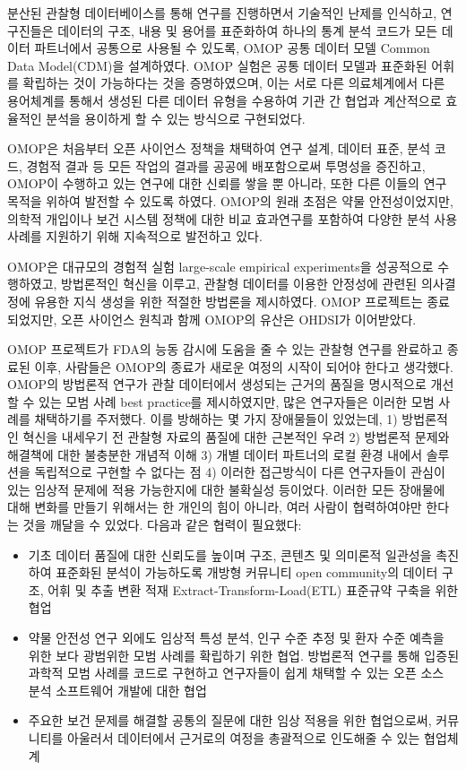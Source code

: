 \documentclass[10.5pt]{book}
\providecommand{\tightlist}{%
  \setlength{\itemsep}{0pt}\setlength{\parskip}{0pt}}
\theoremstyle{definition}
\theoremstyle{definition}
\theoremstyle{definition}
\theoremstyle{remark}
\begin{document}
분산된 관찰형 데이터베이스를 통해 연구를 진행하면서 기술적인 난제를
인식하고, 연구진들은 데이터의 구조, 내용 및 용어를 표준화하여 하나의
통계 분석 코드가 모든 데이터 파트너에서 공통으로 사용될 수 있도록, OMOP
공통 데이터 모델 Common Data Model(CDM)을 설계하였다.
\citep{overhage2012cdm} OMOP 실험은 공통 데이터 모델과 표준화된 어휘를
확립하는 것이 가능하다는 것을 증명하였으며, 이는 서로 다른 의료체계에서
다른 용어체계를 통해서 생성된 다른 데이터 유형을 수용하여 기관 간 협업과
계산적으로 효율적인 분석을 용이하게 할 수 있는 방식으로 구현되었다.

OMOP은 처음부터 오픈 사이언스 정책을 채택하여 연구 설계, 데이터 표준,
분석 코드, 경험적 결과 등 모든 작업의 결과를 공공에 배포함으로써
투명성을 증진하고, OMOP이 수행하고 있는 연구에 대한 신뢰를 쌓을 뿐
아니라, 또한 다른 이들의 연구 목적을 위하여 발전할 수 있도록 하였다.
OMOP의 원래 초점은 약물 안전성이었지만, 의학적 개입이나 보건 시스템
정책에 대한 비교 효과연구를 포함하여 다양한 분석 사용사례를 지원하기
위해 지속적으로 발전하고 있다.

OMOP은 대규모의 경험적 실험 large-scale empirical experiments을
성공적으로 수행하였고, \citep{ryan2012omop, ryan2013omop} 방법론적인
혁신을 이루고, \citep{schuemie_2014} 관찰형 데이터를 이용한 안정성에
관련된 의사결정에 유용한 지식 생성을 위한 적절한 방법론을 제시하였다.
\citep{madigan_2013, madigan2013design} OMOP 프로젝트는 종료되었지만,
오픈 사이언스 원칙과 함께 OMOP의 유산은 OHDSI가 이어받았다.

OMOP 프로젝트가 FDA의 능동 감시에 도움을 줄 수 있는 관찰형 연구를
완료하고 종료된 이후, 사람들은 OMOP의 종료가 새로운 여정의 시작이 되어야
한다고 생각했다. OMOP의 방법론적 연구가 관찰 데이터에서 생성되는 근거의
품질을 명시적으로 개선할 수 있는 모범 사례 best practice를 제시하였지만,
많은 연구자들은 이러한 모범 사례를 채택하기를 주저했다. 이를 방해하는 몇
가지 장애물들이 있었는데, 1) 방법론적인 혁신을 내세우기 전 관찰형 자료의
품질에 대한 근본적인 우려 2) 방법론적 문제와 해결책에 대한 불충분한
개념적 이해 3) 개별 데이터 파트너의 로컬 환경 내에서 솔루션을 독립적으로
구현할 수 없다는 점 4) 이러한 접근방식이 다른 연구자들이 관심이 있는
임상적 문제에 적용 가능한지에 대한 불확실성 등이었다. 이러한 모든
장애물에 대해 변화를 만들기 위해서는 한 개인의 힘이 아니라, 여러 사람이
협력하여야만 한다는 것을 깨달을 수 있었다. 다음과 같은 협력이 필요했다:

\begin{itemize}
\tightlist
\item
  기초 데이터 품질에 대한 신뢰도를 높이며 구조, 콘텐츠 및 의미론적
  일관성을 촉진하여 표준화된 분석이 가능하도록 개방형 커뮤니티 open
  community의 데이터 구조, 어휘 및 추출 변환 적재
  Extract-Transform-Load(ETL) 표준규약 구축을 위한 협업
\item
  약물 안전성 연구 외에도 임상적 특성 분석, 인구 수준 추정 및 환자 수준
  예측을 위한 보다 광범위한 모범 사례를 확립하기 위한 협업. 방법론적
  연구를 통해 입증된 과학적 모범 사례를 코드로 구현하고 연구자들이 쉽게
  채택할 수 있는 오픈 소스 분석 소프트웨어 개발에 대한 협업
\item
  주요한 보건 문제를 해결할 공통의 질문에 대한 임상 적용을 위한
  협업으로써, 커뮤니티를 아울러서 데이터에서 근거로의 여정을 총괄적으로
  인도해줄 수 있는 협업체계
\end{itemize}
\end{document}
